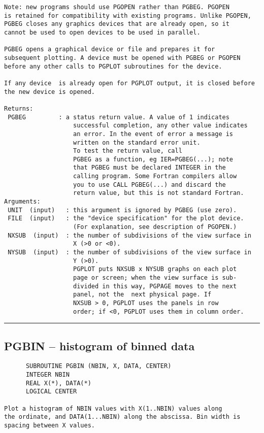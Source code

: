 {\begin{verbatim}
Note: new programs should use PGOPEN rather than PGBEG. PGOPEN
is retained for compatibility with existing programs. Unlike PGOPEN,
PGBEG closes any graphics devices that are already open, so it 
cannot be used to open devices to be used in parallel.

PGBEG opens a graphical device or file and prepares it for
subsequent plotting. A device must be opened with PGBEG or PGOPEN
before any other calls to PGPLOT subroutines for the device.

If any device  is already open for PGPLOT output, it is closed before
the new device is opened.

Returns:
 PGBEG         : a status return value. A value of 1 indicates
                   successful completion, any other value indicates
                   an error. In the event of error a message is
                   written on the standard error unit.  
                   To test the return value, call
                   PGBEG as a function, eg IER=PGBEG(...); note
                   that PGBEG must be declared INTEGER in the
                   calling program. Some Fortran compilers allow
                   you to use CALL PGBEG(...) and discard the
                   return value, but this is not standard Fortran.
Arguments:
 UNIT  (input)   : this argument is ignored by PGBEG (use zero).
 FILE  (input)   : the "device specification" for the plot device.
                   (For explanation, see description of PGOPEN.)
 NXSUB  (input)  : the number of subdivisions of the view surface in
                   X (>0 or <0).
 NYSUB  (input)  : the number of subdivisions of the view surface in
                   Y (>0).
                   PGPLOT puts NXSUB x NYSUB graphs on each plot
                   page or screen; when the view surface is sub-
                   divided in this way, PGPAGE moves to the next
                   panel, not the  next physical page. If
                   NXSUB > 0, PGPLOT uses the panels in row
                   order; if <0, PGPLOT uses them in column order.
\end{verbatim}
\hrule


\subsection*{PGBIN -- histogram of binned data }
\begin{verbatim}
      SUBROUTINE PGBIN (NBIN, X, DATA, CENTER)
      INTEGER NBIN
      REAL X(*), DATA(*)
      LOGICAL CENTER

Plot a histogram of NBIN values with X(1..NBIN) values along
the ordinate, and DATA(1...NBIN) along the abscissa. Bin width is
spacing between X values.


\end{verbatim}}
